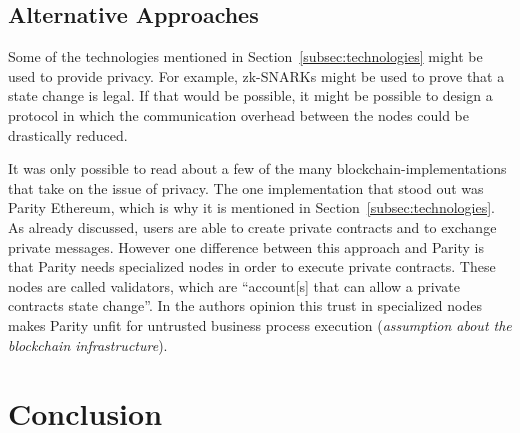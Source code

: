 \documentclass[runningheads]{llncs}
\newcommand{\comment}[1]{}
\newcommand{\refsec}[1]{Section~\ref{#1}}
\newcommand{\quotel}{``}
\newcommand{\quoter}{''}
\begin{document}
\subsection{Alternative Approaches} \label{subsec:alternative}

Some of the technologies mentioned in \refsec{subsec:technologies} might be used to provide privacy. For example, zk-SNARKs might be used to prove that a state change is legal. If that would be possible, it might be possible to design a protocol in which the communication overhead between the nodes could be drastically reduced. 


It was only possible to read about a few of the many block\-chain-im\-ple\-men\-ta\-tions that take on the issue of privacy. The one implementation that stood out was Parity Ethereum, which is why it is mentioned in \refsec{subsec:technologies}. As already discussed, users are able to create private contracts and to exchange private messages. However one difference between this approach and Parity is that Parity needs specialized nodes in order to execute private contracts. These nodes are called validators, which are \quotel account[s] that can allow a private contracts state change\quoter  \cite{parity}. In the authors opinion this trust in specialized nodes makes Parity unfit for untrusted business process execution (\textit{assumption about the blockchain infrastructure}).

\comment{
We would also like to mention Parity Ethereum. With Parity, users are able to hide private contracts in public contracts  and to exchange private messages. However for private contract execution Parity is relying on validators, \quotel account[s] that can allow a private contract's state change\quoter  \cite{parity}. In our understanding this makes Parity unfit for for untrusted business process execution, since, like private blockchains, it requires trust in one or multiple nodes.

\todo{Parity comparison}
}
\section{Conclusion} \label{sec:conclusion}

\comment{
\begin{itemize}
    \item How could mentioned in \refsec{subsec:technologies} improve \refsec{sec:eval}?
    \item How did it work out in the end? 
\end{itemize}}
\end{document}
